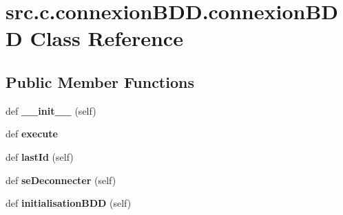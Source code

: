 \hypertarget{classsrc_1_1c_1_1connexion_b_d_d_1_1connexion_b_d_d}{}\section{src.\+c.\+connexion\+B\+D\+D.\+connexion\+B\+D\+D Class Reference}
\label{classsrc_1_1c_1_1connexion_b_d_d_1_1connexion_b_d_d}
\subsection*{Public Member Functions}
\begin{DoxyCompactItemize}
\item 
\hypertarget{classsrc_1_1c_1_1connexion_b_d_d_1_1connexion_b_d_d_a5d5cadf08a2c1ab2a0828112e9bcdf9d}{}def {\bfseries \+\_\+\+\_\+init\+\_\+\+\_\+} (self)\label{classsrc_1_1c_1_1connexion_b_d_d_1_1connexion_b_d_d_a5d5cadf08a2c1ab2a0828112e9bcdf9d}

\item 
\hypertarget{classsrc_1_1c_1_1connexion_b_d_d_1_1connexion_b_d_d_af30169dfa55d7453889ab4f4bc0f12b2}{}def {\bfseries execute}\label{classsrc_1_1c_1_1connexion_b_d_d_1_1connexion_b_d_d_af30169dfa55d7453889ab4f4bc0f12b2}

\item 
\hypertarget{classsrc_1_1c_1_1connexion_b_d_d_1_1connexion_b_d_d_a00b06ce5195302a82dea85f22ac63610}{}def {\bfseries last\+Id} (self)\label{classsrc_1_1c_1_1connexion_b_d_d_1_1connexion_b_d_d_a00b06ce5195302a82dea85f22ac63610}

\item 
\hypertarget{classsrc_1_1c_1_1connexion_b_d_d_1_1connexion_b_d_d_a69e5556442ed8546a1af73b9755458e2}{}def {\bfseries se\+Deconnecter} (self)\label{classsrc_1_1c_1_1connexion_b_d_d_1_1connexion_b_d_d_a69e5556442ed8546a1af73b9755458e2}

\item 
\hypertarget{classsrc_1_1c_1_1connexion_b_d_d_1_1connexion_b_d_d_a21ece7dac895092c94169d64f1abe0bd}{}def {\bfseries initialisation\+B\+D\+D} (self)\label{classsrc_1_1c_1_1connexion_b_d_d_1_1connexion_b_d_d_a21ece7dac895092c94169d64f1abe0bd}

\end{DoxyCompactItemize}
